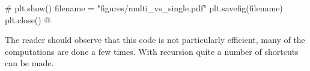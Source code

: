 \begin{question}
\begin{solution}
\begin{enumerate}
# plt.show()
filename = "figures/multi_vs_single.pdf"
plt.savefig(filename)
plt.close()
@

The reader should observe that this code is not particularly
efficient, many of the computations are done a few times. With
recursion quite a number of shortcuts can be made.

    \end{enumerate}
\end{solution}
\end{question}


